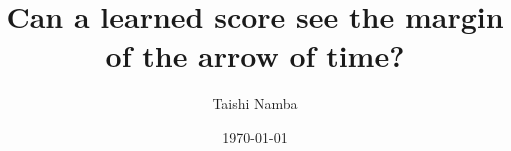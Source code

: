 \documentclass[aps,pre,reprint,twocolumn,nofootinbib,superscriptaddress]{revtex4-2}
\theoremstyle{remark}
\begin{document}
\title{Can a learned score see the margin of the arrow of time?}

\author{Taishi Namba}

\date{\today}



\maketitle










\appendix






\end{document}
